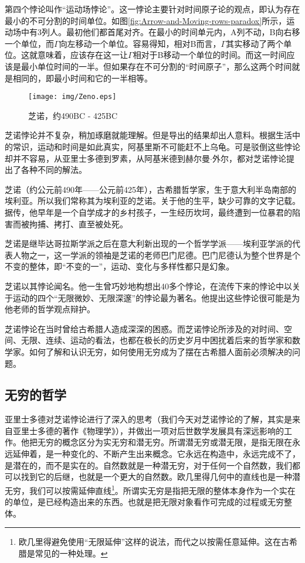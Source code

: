 \documentclass{article}
\begin{document}
第四个悖论叫作“运动场悖论”。这一悖论主要针对时间原子论的观点，即认为存在最小的不可分割的时间单位。如图\ref{fig:Arrow-and-Moving-rows-paradox}所示，运动场中有3列人。最初他们都首尾对齐。在最小的时间单元内，A列不动，B向右移一个单位，而$\Gamma$向左移动一个单位。容易得知，相对B而言，$\Gamma$其实移动了两个单位。这就意味着，应该存在这一让$\Gamma$相对于B移动一个单位的时间。而这一时间应该是最小单位时间的一半。但如果存在不可分割的“时间原子”，那么这两个时间就是相同的，即最小时间和它的一半相等。

\begin{wrapfigure}{L}{0.3\textwidth}
 \centering
 \texttt{[image: img/Zeno.eps]}
 \captionsetup{labelformat=empty}
 \caption{芝诺，约490BC - 425BC}
 \label{fig:Zeno-of-Elea}
\end{wrapfigure}

芝诺悖论并不复杂，稍加琢磨就能理解。但是导出的结果却出人意料。根据生活中的常识，运动和时间是如此真实，阿基里斯不可能赶不上乌龟。可是驳倒这些悖论却并不容易，从亚里士多德到罗素，从阿基米德到赫尔曼$\cdot$外尔，都对芝诺悖论提出了各种不同的解法\cite{Wikipedia-Zeno}。

芝诺（约公元前490年——公元前425年），古希腊哲学家，生于意大利半岛南部的埃利亚。所以我们常称其为埃利亚的芝诺。关于他的生平，缺少可靠的文字记载。据传，他早年是一个自学成才的乡村孩子，一生经历坎坷，最终遭到一位暴君的陷害而被拘捕、拷打、直至被处死\cite{HanXueTao16}。

芝诺是继毕达哥拉斯学派之后在意大利新出现的一个哲学学派——埃利亚学派的代表人物之一，这一学派的领袖是芝诺的老师巴门尼德。巴门尼德认为整个世界是个不变的整体，即“不变的一”，运动、变化与多样性都只是幻象。

芝诺以其悖论闻名。他一生曾巧妙地构想出40多个悖论，在流传下来的悖论中以关于运动的四个“无限微妙、无限深邃”的悖论最为著名。他提出这些悖论很可能是为他老师的哲学观点辩护。

芝诺悖论在当时曾给古希腊人造成深深的困惑。而芝诺悖论所涉及的对时间、空间、无限、连续、运动的看法，也都在极长的历史岁月中困扰着后来的哲学家和数学家。如何了解和认识无穷，如何使用无穷成为了摆在古希腊人面前必须解决的问题。

\subsection{无穷的哲学}
亚里士多德对芝诺悖论进行了深入的思考（我们今天对芝诺悖论的了解，其实是来自亚里士多德的著作《物理学》），并做出一项对后世数学发展具有深远影响的工作。他把无穷的概念区分为实无穷和潜无穷。所谓潜无穷或潜无限，是指无限在永远延伸着，是一种变化的、不断产生出来概念。它永远在构造中，永远完成不了，是潜在的，而不是实在的。自然数就是一种潜无穷，对于任何一个自然数，我们都可以找到它的后继，也就是一个更大的自然数。欧几里得几何中的直线也是一种潜无穷，我们可以按需延伸直线\footnote{欧几里得避免使用“无限延伸”这样的说法，而代之以按需任意延伸。这在古希腊是常见的一种处理。}。所谓实无穷是指把无限的整体本身作为一个实在的单位，是已经构造出来的东西。也就是把无限对象看作可完成的过程或无穷整体。
\end{document}
